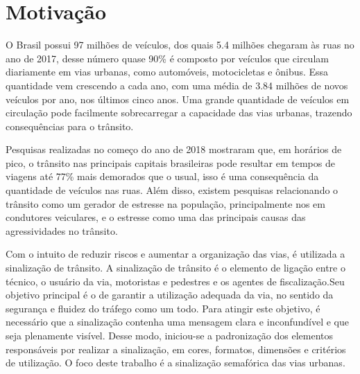 \section{Motivação}

O Brasil possui 97 milhões de veículos, dos quais 5.4 milhões chegaram às ruas no ano de 2017, desse número quase 90\% é composto por veículos que circulam diariamente em vias urbanas, como automóveis, motocicletas e ônibus. Essa quantidade vem crescendo a cada ano, com uma média de 3.84 milhões de novos veículos por ano, nos últimos cinco anos. %
Uma grande quantidade de veículos em circulação pode facilmente sobrecarregar a capacidade das vias urbanas, trazendo consequências para o trânsito.

Pesquisas realizadas no começo do ano de 2018 mostraram que, em horários de pico, o trânsito nas principais capitais brasileiras pode resultar em tempos de viagens até 77\% mais demorados que o usual, %
isso é uma consequência da quantidade de veículos nas ruas. Além disso, existem pesquisas relacionando o trânsito como um gerador de estresse na população, principalmente nos em condutores veiculares, e o estresse como uma das principais causas das agressividades no trânsito.  %

Com o intuito de reduzir riscos e aumentar a organização das vias, é utilizada a sinalização de trânsito. A sinalização de trânsito é o elemento de ligação entre o técnico, o usuário da via, motoristas e pedestres e os agentes de fiscalização.Seu objetivo principal é o de garantir a utilização adequada da via, no sentido da segurança e fluidez do tráfego como um todo. Para atingir este objetivo, é necessário que a sinalização contenha uma mensagem clara e inconfundível e que seja plenamente visível. Desse modo, iniciou-se a padronização dos elementos responsáveis por realizar a sinalização, em cores, formatos, dimensões e critérios de utilização. %
O foco deste trabalho é a sinalização semafórica das vias urbanas.

